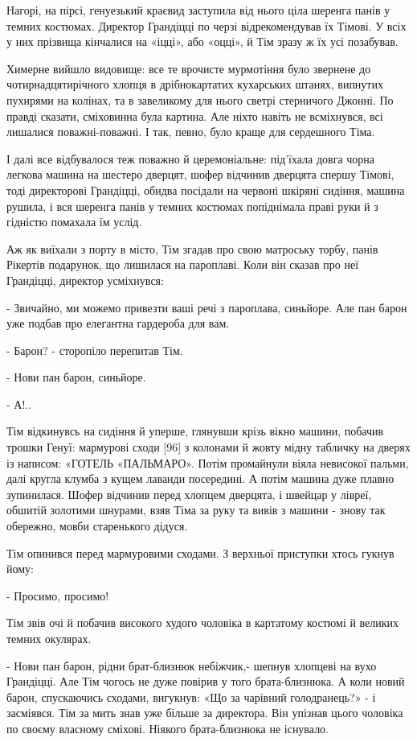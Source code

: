 Нагорі, на пірсі, генуезький краєвид заступила від нього ціла шеренга панів у темних костюмах. Директор Грандіцці по черзі відрекомендував їх Тімові. У всіх у них прізвища кінчалися на «іцці», або «оцці», й Тім зразу ж їх усі позабував.

Химерне вийшло видовище: все те врочисте мурмотіння було звернене до чотирнадцятирічного хлопця в дрібнокартатих кухарських штанях, випнутих пухирями на колінах, та в завеликому для нього светрі стерничого Джонні. По правді сказати, сміховинна була картина. Але ніхто навіть не всміхнувся, всі лишалися поважні-поважні. І так, певно, було краще для сердешного Тіма.

І далі все відбувалося теж поважно й церемоніальне: під'їхала довга чорна легкова машина на шестеро дверцят, шофер відчинив дверцята спершу Тімові, тоді директорові Грандіцці, обидва посідали на червоні шкіряні сидіння, машина рушила, і вся шеренга панів у темних костюмах попіднімала праві руки й з гідністю помахала їм услід.

Аж як виїхали з порту в місто, Тім згадав про свою матроську торбу, панів Рікертів подарунок, що лишилася на пароплаві. Коли він сказав про неї Грандіцці, директор усміхнувся:

- Звичайно, ми можемо привезти ваші речі з пароплава, синьйоре. Але пан барон уже подбав про елегантна гардероба для вам.

- Барон? - сторопіло перепитав Тім.

- Нови пан барон, синьйоре.

- А!..

Тім відкинувсь на сидіння й уперше, глянувши крізь вікно машини, побачив трошки Генуї: мармурові сходи [96] з колонами й жовту мідну табличку на дверях із написом: «ГОТЕЛЬ «ПАЛЬМАРО». Потім промайнули віяла невисокої пальми, далі кругла клумба з кущем лаванди посередині. А потім машина дуже плавно зупинилася. Шофер відчинив перед хлопцем дверцята, і швейцар у лівреї, обшитій золотими шнурами, взяв Тіма за руку та вивів з машини - знову так обережно, мовби старенького дідуся.

Тім опинився перед мармуровими сходами. З верхньої приступки хтось гукнув йому:

- Просимо, просимо!

Тім звів очі й побачив високого худого чоловіка в картатому костюмі й великих темних окулярах.

- Нови пан барон, рідни брат-близнюк небіжчик,- шепнув хлопцеві на вухо Грандіцці. Але Тім чогось не дуже повірив у того брата-близнюка. А коли новий барон, спускаючись сходами, вигукнув: «Що за чарівний голодранець?» - і засміявся. Тім за мить знав уже більше за директора. Він упізнав цього чоловіка по своєму власному сміхові. Ніякого брата-близнюка не існувало.

